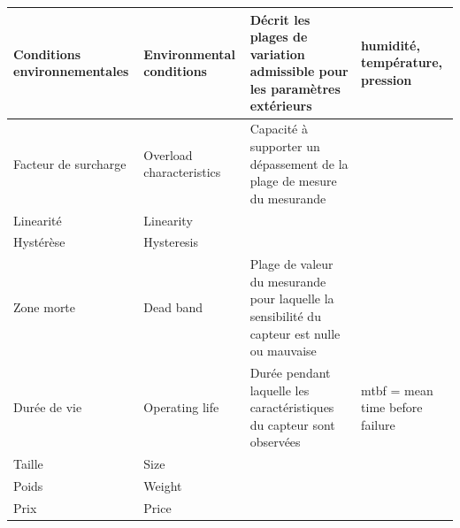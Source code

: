 \begin {center}
\begin{tabular}{|p{2.2cm}|p{2.8cm}|p{6.8cm}|p{2.4cm}|}
    \hline
    Conditions environnementales & Environmental conditions & Décrit les plages de variation admissible pour les paramètres extérieurs                                                & humidité, température, pression \\
    \hline
    Facteur de surcharge         & Overload characteristics & Capacité à supporter un dépassement de la plage de mesure du mesurande                                                  &                                 \\
    \hline
    Linearité                    & Linearity                &                                                                                                                         &                                 \\
    \hline
    Hystérèse                    & Hysteresis               &                                                                                                                         &                                 \\
    \hline
    Zone morte                   & Dead band                & Plage de valeur du mesurande pour laquelle la sensibilité du capteur est nulle ou mauvaise                              &                                 \\
    \hline
    Durée de vie                 & Operating life           & Durée pendant laquelle les caractéristiques du capteur sont observées                                                   & mtbf = mean time before failure \\
    \hline
    Taille                       & Size                     &                                                                                                                         &                                 \\
    \hline
    Poids                        & Weight                   &                                                                                                                         &                                 \\
    \hline
    Prix                         & Price                    &                                                                                                                         &                                 \\
    \hline
\end{tabular}
\end{center}

